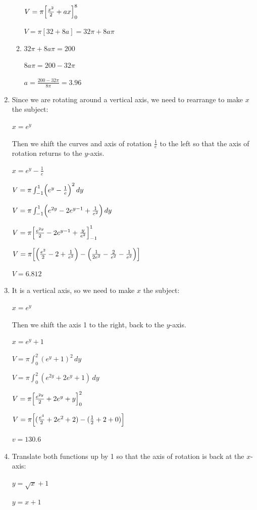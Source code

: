 \documentclass[../main.tex]{subfiles}
\begin{document}
\begin{spacing}{1.5}
\begin{enumerate}[itemsep=0.7cm]
\begin{enumerate}
        $V=\pi \Bigl[\frac{x^2}{2}+ax\Bigr]_0^8$

        $V=\pi[32+8a]=32\pi+8a\pi$

        \item 
        $32\pi + 8a\pi=200$

        $8a\pi=200-32\pi$

        $a=\frac{200-32\pi}{8\pi}=3.96$

    \end{enumerate}
    
    \item 
    Since we are rotating around a vertical axis, we need to rearrange to make $x$ the subject:

    $x=e^y$

    Then we shift the curves and axis of rotation $\frac{1}{e}$ to the left so that the axis of rotation returns to the $y$-axis.

    $x=e^y-\frac{1}{e}$

    $V=\pi \int_{-1}^1 \Bigl(e^y -\frac{1}{e}\Bigr)^2\,dy$

    $V=\pi \int_{-1}^1 \Bigl(e^{2y}-2e^{y-1}+\frac{1}{e^2}\Bigr)\,dy$

    $V=\pi \Bigl[\frac{e^{2y}}{2}-2e^{y-1}+\frac{y}{e^2}\Bigr]_{-1}^1$

    $V=\pi \Bigl[\Bigl(\frac{e^2}{2}-2+\frac{1}{e^2}\Bigr)-\Bigl(\frac{1}{2e^2}-\frac{2}{e^2}-\frac{1}{e^2}\Bigr)\Bigr]$

    $V=6.812$

    \item 
    It is a vertical axis, so we need to make $x$ the subject:

    $x=e^y$

    Then we shift the axis 1 to the right, back to the $y$-axis.

    $x=e^y+1$

    $V=\pi \int_0^2 (e^y +1)^2\,dy$

    $V=\pi \int_0^2 (e^{2y}+2e^y+1)\,dy$

    $V=\pi \Bigl[\frac{e^{2y}}{2}+2e^y+y\Bigr]_0^2$

    $V=\pi \Bigl[(\frac{e^4}{2}+2e^2+2)-(\frac{1}{2}+2+0)\Bigr]$

    $v=130.6$

    \item 
    Translate both functions up by 1 so that the axis of rotation is back at the $x$-axis:

    $y=\sqrt{x}+1$

    $y=x+1$


\end{enumerate}
\end{spacing}
\end{document}
